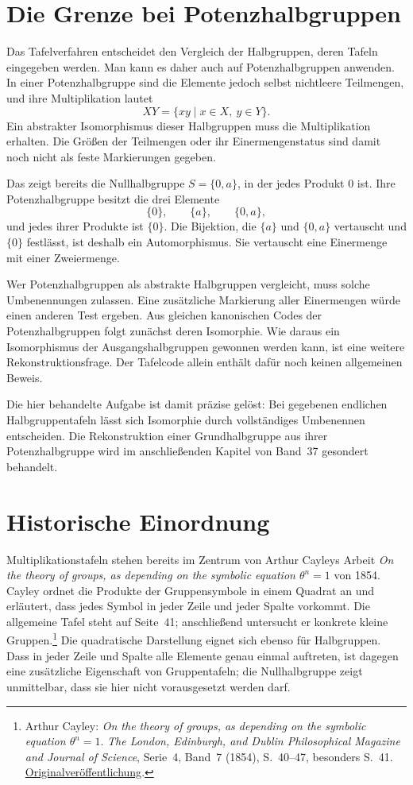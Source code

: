 \section*{Die Grenze bei Potenzhalbgruppen}

Das Tafelverfahren entscheidet den Vergleich der Halbgruppen,
deren Tafeln eingegeben werden. Man kann es daher auch auf
Potenzhalbgruppen anwenden. In einer Potenzhalbgruppe sind die
Elemente jedoch selbst nichtleere Teilmengen, und ihre Multiplikation
lautet
\[
  XY=\{xy\mid x\in X,\ y\in Y\}.
\]
Ein abstrakter Isomorphismus dieser Halbgruppen muss die
Multiplikation erhalten. Die Größen der Teilmengen oder ihr
Einermengenstatus sind damit noch nicht als feste Markierungen
gegeben.

Das zeigt bereits die Nullhalbgruppe \(S=\{0,a\}\), in der jedes
Produkt \(0\) ist. Ihre Potenzhalbgruppe besitzt die drei Elemente
\[
  \{0\},\qquad\{a\},\qquad\{0,a\},
\]
und jedes ihrer Produkte ist \(\{0\}\). Die Bijektion, die
\(\{a\}\) und \(\{0,a\}\) vertauscht und \(\{0\}\) festlässt,
ist deshalb ein Automorphismus. Sie vertauscht eine Einermenge mit
einer Zweiermenge.

Wer Potenzhalbgruppen als abstrakte Halbgruppen vergleicht, muss
solche Umbenennungen zulassen. Eine zusätzliche Markierung aller
Einermengen würde einen anderen Test ergeben. Aus gleichen
kanonischen Codes der Potenzhalbgruppen folgt zunächst deren
Isomorphie. Wie daraus ein Isomorphismus der Ausgangshalbgruppen
gewonnen werden kann, ist eine weitere Rekonstruktionsfrage. Der
Tafelcode allein enthält dafür noch keinen allgemeinen Beweis.

Die hier behandelte Aufgabe ist damit präzise gelöst: Bei gegebenen
endlichen Halbgruppentafeln lässt sich Isomorphie durch vollständiges
Umbenennen entscheiden. Die Rekonstruktion einer Grundhalbgruppe
aus ihrer Potenzhalbgruppe wird im anschließenden Kapitel von
Band~37 gesondert behandelt.

\section*{Historische Einordnung}

Multiplikationstafeln stehen bereits im Zentrum von Arthur Cayleys
Arbeit \emph{On the theory of groups, as depending on the symbolic
equation \(\theta^n=1\)} von 1854. Cayley ordnet die Produkte der
Gruppensymbole in einem Quadrat an und erläutert, dass jedes Symbol
in jeder Zeile und jeder Spalte vorkommt. Die allgemeine Tafel steht
auf Seite~41; anschließend untersucht er konkrete kleine Gruppen.\footnote{%
Arthur Cayley: \emph{On the theory of groups, as depending on the symbolic
equation \(\theta^n=1\)}. \emph{The London, Edinburgh, and Dublin
Philosophical Magazine and Journal of Science}, Serie~4, Band~7 (1854),
S.~40--47, besonders S.~41.
\href{https://doi.org/10.1080/14786445408647421}{Originalveröffentlichung}.}
Die quadratische Darstellung eignet sich ebenso für Halbgruppen.
Dass in jeder Zeile und Spalte alle Elemente genau einmal auftreten,
ist dagegen eine zusätzliche Eigenschaft von Gruppentafeln; die
Nullhalbgruppe zeigt unmittelbar, dass sie hier nicht vorausgesetzt
werden darf.


